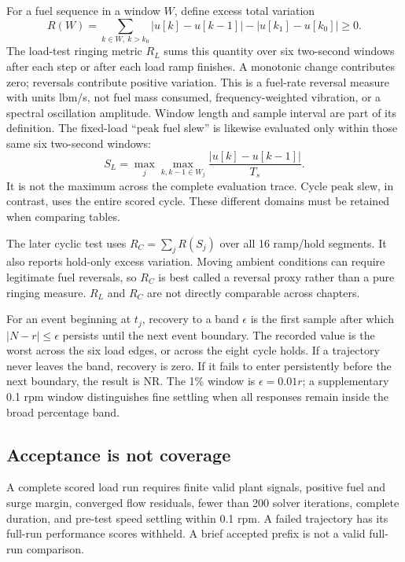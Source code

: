 For a fuel sequence in a window $W$, define excess total variation
\begin{equation}
R(W)=\sum_{k\in W,\ k>k_0}|u[k]-u[k-1]|-|u[k_1]-u[k_0]|\geq0.
\label{eq:ring}
\end{equation}
The load-test ringing metric $R_L$ sums this quantity over six two-second windows after each step or after each load ramp finishes. A monotonic change contributes zero; reversals contribute positive variation. This is a fuel-rate reversal measure with units lbm/s, not fuel mass consumed, frequency-weighted vibration, or a spectral oscillation amplitude. Window length and sample interval are part of its definition. The fixed-load ``peak fuel slew'' is likewise evaluated only within those same six two-second windows:
\begin{equation}
S_L=\max_j\max_{k,k-1\in W_j}\frac{|u[k]-u[k-1]|}{T_s}.
\end{equation}
It is not the maximum across the complete evaluation trace. Cycle peak slew, in contrast, uses the entire scored cycle. These different domains must be retained when comparing tables.

The later cyclic test uses $R_C=\sum_jR(S_j)$ over all 16 ramp/hold segments. It also reports hold-only excess variation. Moving ambient conditions can require legitimate fuel reversals, so $R_C$ is best called a reversal proxy rather than a pure ringing measure. $R_L$ and $R_C$ are not directly comparable across chapters.

For an event beginning at $t_j$, recovery to a band $\epsilon$ is the first sample after which $|N-r|\leq\epsilon$ persists until the next event boundary. The recorded value is the worst across the six load edges, or across the eight cycle holds. If a trajectory never leaves the band, recovery is zero. If it fails to enter persistently before the next boundary, the result is NR. The 1\% window is $\epsilon=0.01r$; a supplementary 0.1 rpm window distinguishes fine settling when all responses remain inside the broad percentage band.

\subsection{Acceptance is not coverage}
A complete scored load run requires finite valid plant signals, positive fuel and surge margin, converged flow residuals, fewer than 200 solver iterations, complete duration, and pre-test speed settling within 0.1 rpm. A failed trajectory has its full-run performance scores withheld. A brief accepted prefix is not a valid full-run comparison.

